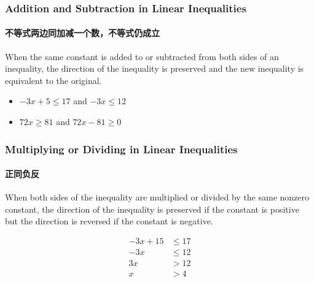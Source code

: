 \documentclass[
	11pt, %
	handout,
]{beamer}
\begin{document}

\begin{frame}
	\frametitle{Addition and Subtraction in  Linear Inequalities}
	\framesubtitle{不等式两边同加减一个数，不等式仍成立}

	\begin{theorem}[Rule 1]
		When the same constant is added to or subtracted from both sides of an inequality, the direction of the inequality is preserved and the new inequality is equivalent to the original.
	\end{theorem}

	\begin{example}
		\begin{itemize}
			\item   $-3x +5 \leq 17 $ and $-3x \leq 12$
			\item   $72x  \geq 81 $ and $72x  -81 \geq 0 $
		\end{itemize}
	\end{example}

\end{frame}




\begin{frame}
	\frametitle{Multiplying or Dividing in  Linear Inequalities}
	\framesubtitle{正同负反}
	\begin{theorem}[Rule 2]
		When both sides of the inequality are multiplied or divided by the same nonzero constant, the direction of the inequality is \alert{preserved if the constant is positive} but the direction is \alert{reversed if the constant is negative}.
	\end{theorem}

	\begin{example}
	  \begin{equation*}
	  	\begin{split}
	  		-3x + 15 &\leq 17\\
	  		-3x &\leq 12 \\
	  		3x &>12 \\
	  		x &> 4\\
	  	\end{split}
	  \end{equation*}
	\end{example}

\end{frame}

\end{document}

